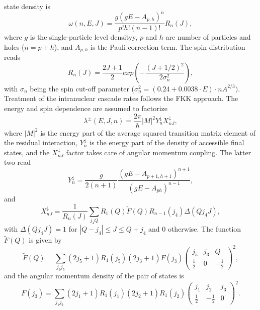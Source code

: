 \documentclass[twocolumn,amsmath,amssymb,10pt,groupedaddress,letter]{revtex4}
\begin{document}
state density is
\begin{equation}
\omega(n,E,J)=\frac{g(gE-A_{p,h})^{n}}{p!h!(n-1)!}R_{n}(J),
\end{equation}
\noindent where $g$ is the single-particle level densityy,
$p$ and $h$ are number of particles and holes ($n=p+h$), and $A_{p,h}$
is the Pauli correction term. The spin distribution reads
\begin{equation}
R_{n}(J)=\frac{2J+1}{2}exp\left(-\frac{(J+1/2)^{2}}{2\sigma_{n}^{2}}\right),
\end{equation}
 with $\sigma_{n}$ being the spin cut-off parameter ($\sigma_{n}^{2}=(0.24+0.0038\cdot E)\cdot nA^{2/3}).$
Treatment of the intranuclear cascade rates follows the FKK \cite{FKK}
approach. The energy and spin dependence are assumed to factorize
\begin{equation}
\lambda^{\pm}(E,J,n)=\frac{2\pi}{\hbar}|M|^{2}Y_{n}^{\downarrow}X_{nJ}^{\downarrow},
\end{equation}
\noindent where $|M|^{2}$ is the energy part of the average squared transition
matrix element of the residual interaction, $Y_{n}^{\downarrow}$
is the energy part of the density of accessible final states,  and
the $X_{nJ}^{\downarrow}$ factor takes care of angular momentum coupling.
The latter two read
\begin{equation}
Y_{n}^{\downarrow}=\frac{g}{2(n+1)}\frac{(gE-A_{p+1,h+1})^{n+1}}{(gE-A_{ph})^{n-1}},
\end{equation}
 and
\begin{equation}
X_{nJ}^{\downarrow}=\frac{1}{R_{n}(J)}\sum_{j_{4}Q}R_{1}(Q)\widetilde{F}(Q)R_{n-1}(j_{4})\Delta(Qj_{4}J),
\end{equation}
 with $\Delta(Qj_{4}J)=1$ for $|Q-j_{4}|\leq J\leq Q+j_{4}$ and
0 otherwise. The function $\widetilde{F}(Q)$ is given by
\begin{equation}
\widetilde{F}(Q)=\sum_{j_{3}j_{5}}(2j_{5}+1)R_{1}(j_{5})(2j_{3}+1)F(j_{3})\left(\begin{array}{ccc}
j_{5} & j_{3} & Q\\
\frac{1}{2} & 0 & -\frac{1}{2}\end{array}\right)^{2},
\end{equation}
 and the angular momentum density of the pair of states is
\begin{equation}
F(j_{3})=\sum_{j_{1}j_{2}}(2j_{1}+1)R_{1}(j_{1})(2j_{2}+1)R_{1}(j_{2})\left(\begin{array}{ccc}
j_{1} & j_{2} & j_{3}\\
\frac{1}{2} & -\frac{1}{2} & 0\end{array}\right)^{2}.
\end{equation}
\end{document}
